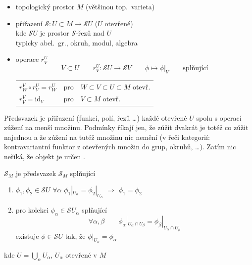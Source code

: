 \newpage
{}
\begin{definice}
\begin{itemize}[nosep]
  \item topologický prostor $M$ \hfill (většinou top.\ varieta)
  \item přiřazení \quad $\mathcal{S}: U\subset M\to\mathcal{S}U$ \hfill ($U$ otevřené) \\
        kde $\mathcal{S}U$ je prostor $\mathcal{S}$-řezů nad $U$ \\
        typicky abel.\ gr., okruh, modul, algebra
  \item operace  $r^U_V$
  \[
    V\subset U \qquad r^U_V:\mathcal{S}U\to\mathcal{S}V \qquad \phi\mapsto\phi|_V \qquad\text{splňující}
  \]
  \begin{tabular}{@{}lll}
    $r^V_W\circ r^U_V = r^U_W$ & pro & $W\subset V\subset U\subset M$ otevř. \\
    $r^V_V = \mathrm{id}_V$ & pro & $V\subset M$ otevř.
  \end{tabular}
\end{itemize}
\end{definice}

\begin{vysvetleni}[Předsvazek]
Předsvazek je přiřazení  (funkcí, polí, řezů \dots) každé otevřené $U$ spolu s operací zúžení
na menší množinu. Podmínky říkají jen, že zúžit dvakrát je totéž co zúžit najednou a že zúžení na tutéž množinu nic nemění
(v řeči kategorií: kontravariantní funktor z otevřených množin do grup, okruhů, \dots). Zatím nic neříká, že objekt je určen .
\end{vysvetleni}

\begin{definice}
 $\mathcal{S}_M$ je předsvazek $\mathcal{S}_M$ splňující
\begin{enumerate}[label=\arabic*)]
  \item $\phi_1,\phi_2\in\mathcal{S}U$ \quad $\forall\alpha$ \quad $\phi_1|_{U_\alpha} = \phi_2|_{U_\alpha}$ \quad $\Rightarrow$ \quad $\phi_1 = \phi_2$
  \item pro kolekci $\phi_\alpha\in\mathcal{S}U_\alpha$ splňující
  \[
    \forall\alpha,\beta \qquad \phi_\alpha|_{U_\alpha\cap U_\beta} = \phi_\beta|_{U_\alpha\cap U_\beta}
  \]
  existuje $\phi\in\mathcal{S}U$ tak, že $\phi|_{U_\alpha} = \phi_\alpha$
\end{enumerate}
kde $U = \bigcup_\alpha U_\alpha$, \quad $U_\alpha$ otevřené v $M$
\end{definice}

